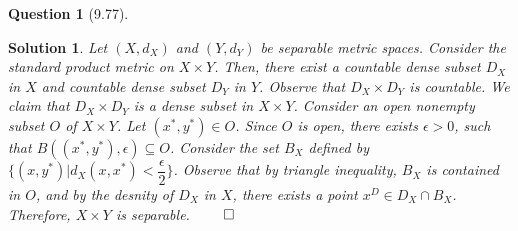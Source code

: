 \documentclass{article} %
\theoremstyle{quest}
\newtheorem*{question}{Question}
\newtheorem*{solution}{Solution}
\begin{document}
\bigskip

\begin{question}[9.77]
\end{question}
\begin{solution}
Let $(X,d_X)$ and $(Y,d_Y)$ be separable metric spaces. Consider the standard
product metric on $X \times Y$. Then, there exist 
a countable dense subset $D_X$ in $X$ and countable dense 
subset $D_Y$ in $Y$. Observe that $D_X \times D_Y$ is countable. 
We claim that $D_X \times D_Y$ is a dense
subset in $X \times Y$. Consider an open nonempty subset $O$ of $X \times Y$.
Let $(x^*,y^*) \in O$. Since $O$ is open, there exists $\epsilon > 0$, such that
$B((x^*,y^*),\epsilon) \subseteq O$. Consider the set $B_X$ defined by
$\{ (x, y^*) | d_X(x,x^*) < \dfrac{\epsilon}{2} \}$. 
Observe that by triangle inequality, $B_X$ is contained
in $O$, and by the desnity of $D_X$ in $X$, there exists a point $x^D 
\in D_X \cap B_X$. 
Therefore, $X \times Y$ is separable. $\qed$
\end{solution}
\end{document}
